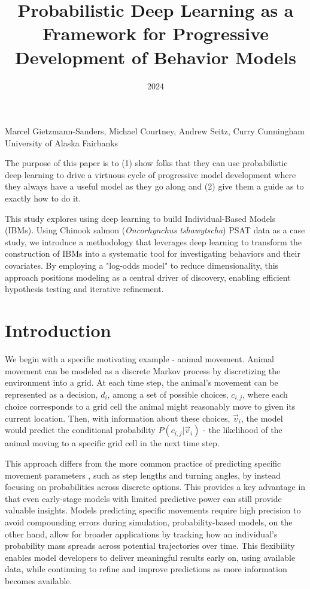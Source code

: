 \documentclass[11pt]{article}
\title{Probabilistic Deep Learning as a Framework for Progressive Development of Behavior Models}
\date{2024}
\makeatletter
\renewcommand{\maketitle}{
\begin{center}

\pagestyle{empty}

{\LARGE \bf \@title\par}
\vspace{1cm}

{\Large Marcel Gietzmann-Sanders, Michael Courtney, Andrew Seitz, Curry Cunningham}\\[1cm]

University of Alaska Fairbanks


\end{center}
}\makeatother
\makeatother
\begin{document}
\maketitle


\begin{center}
The purpose of this paper is to (1) show folks that they can use probabilistic deep learning to drive a virtuous cycle of progressive model development where they always have a useful model as they go along and (2) give them a guide as to exactly how to do it.
\end{center}

\begin{center}
This study explores using deep learning to build Individual-Based Models (IBMs). Using Chinook salmon (\textit{Oncorhynchus tshawytscha}) PSAT data as a case study, we introduce a methodology that leverages deep learning to transform the construction of IBMs into a systematic tool for investigating behaviors and their covariates. By employing a "log-odds model" to reduce dimensionality, this approach positions modeling as a central driver of discovery, enabling efficient hypothesis testing and iterative refinement.
\end{center}



\section*{Introduction}

We begin with a specific motivating example - animal movement. Animal movement can be modeled as a discrete Markov process by discretizing the environment into a grid. At each time step, the animal's movement can be represented as a decision, $d_i$, among a set of possible choices, $c_{i,j}$, where each choice corresponds to a grid cell the animal might reasonably move to given its current location. Then, with information about these choices, $\vec{v}_{i}$, the model would predict the conditional probability $P(c_{i,j} | \vec{v}_{i})$ - the likelihood of the animal moving to a specific grid cell in the next time step.

This approach differs from the more common practice of predicting specific movement parameters \citep{mlmovement1}, such as step lengths and turning angles, by instead focusing on probabilities across discrete options. This provides a key advantage in that even early-stage models with limited predictive power can still provide valuable insights. Models predicting specific movements require high precision to avoid compounding errors during simulation, probability-based models, on the other hand, allow for broader applications by tracking how an individual's probability mass spreads across potential trajectories over time. This flexibility enables model developers to deliver meaningful results early on, using available data, while continuing to refine and improve predictions as more information becomes available.
\end{document}
